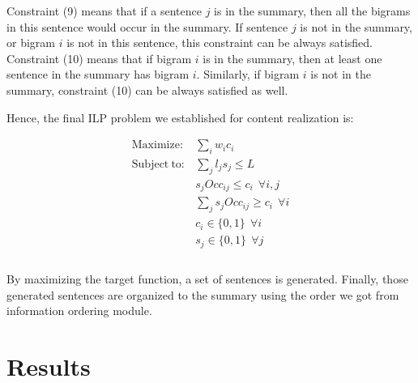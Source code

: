 \documentclass[11pt]{article}
\begin{document}
Constraint (9) means that if a sentence $j$ is in the summary, then all the bigrams in this sentence would occur in the summary. If sentence $j$ is not in the summary, or bigram $i$ is not in this sentence, this constraint can be always satisfied. Constraint (10) means that if bigram $i$ is in the summary, then at least one sentence in the summary has bigram $i$. Similarly, if bigram $i$ is not in the summary, constraint (10) can be always satisfied as well.

Hence, the final ILP problem we established for content realization is:

\begin{equation}
	\begin{aligned}
	\mathrm{Maximize:} & \sum_i{w_ic_i} \\
	\mathrm{Subject\ to:} & \sum_j{l_js_j} \leq L \\
 	& s_jOcc_{ij} \leq c_i\ \ \forall i,j\\
	& \sum_j s_jOcc_{ij} \geq c_i\ \ \forall i \\
	& c_i \in \{0,1\}\ \ \forall i \\
	& s_j \in \{0,1\}\ \ \forall j \\
	\end{aligned}
\end{equation}
\\
\indent
By maximizing the target function, a set of sentences is generated. Finally, those generated sentences are organized to the summary using the order we got from information ordering module.

\section{Results}
\end{document}
